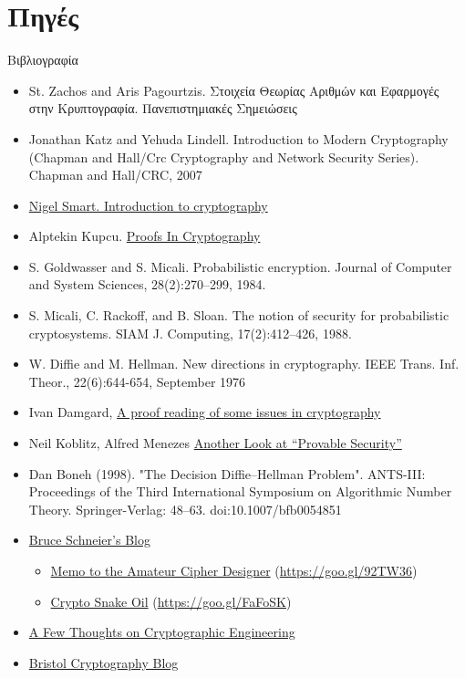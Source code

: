 \documentclass[handout]{beamer}
\begin{document}
\section{Πηγές}
\begin{frame}[allowframebreaks]{Βιβλιογραφία}
\begin{small}
\begin{itemize}
\item St. Zachos and Aris Pagourtzis. Στοιχεία Θεωρίας Αριθμών και Εφαρμογές στην Κρυπτογραφία. Πανεπιστημιακές Σημειώσεις
\item Jonathan Katz and Yehuda Lindell. Introduction to Modern Cryptography (Chapman and Hall/Crc Cryptography and Network Security Series). Chapman
and Hall/CRC, 2007
\item \href{http://goo.gl/b75I29}{Nigel Smart. Introduction to cryptography} 

\item Alptekin Kupcu. \href{https://goo.gl/l4GT2u}{Proofs In Cryptography}

\item S. Goldwasser and S. Micali. Probabilistic encryption. Journal of Computer and System Sciences, 28(2):270–299, 1984.
\item S. Micali, C. Rackoff, and B. Sloan. The notion of security for probabilistic cryptosystems. SIAM J. Computing, 17(2):412–426, 1988.

\framebreak

\item W. Diffie and M. Hellman. New directions in cryptography. IEEE Trans. Inf. Theor., 22(6):644-654, September 1976

\item Ivan Damgard, \href{http://goo.gl/mgAXC8}{A proof reading of some issues in cryptography}
\item Neil Koblitz, Alfred Menezes \href{https://goo.gl/GJNklR}{Another Look at “Provable Security”}

\item Dan Boneh (1998). "The Decision Diffie–Hellman Problem". ANTS-III: Proceedings of the Third International Symposium on Algorithmic Number Theory. Springer-Verlag: 48–63. doi:10.1007/bfb0054851

\item \href{https://www.schneier.com/}{Bruce Schneier's Blog}
\begin{itemize}
\item \href{https://goo.gl/92TW36}{Memo to the Amateur Cipher Designer} (\url{https://goo.gl/92TW36})
\item \href{https://goo.gl/FaFoSK}{Crypto Snake Oil} (\url{https://goo.gl/FaFoSK})
\end{itemize}
\item \href{http://blog.cryptographyengineering.com/}{A Few Thoughts on Cryptographic Engineering}
\item \href{http://goo.gl/whmmb9}{Bristol Cryptography Blog}


\end{itemize}
\end{small}
\end{frame}
\end{document}
